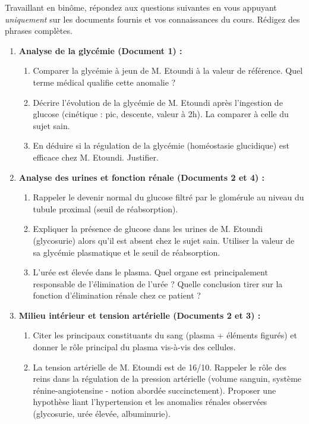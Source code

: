 \documentclass[11pt]{article}
\newcounter{popsec}
\newcounter{popsub}
\newcommand{\courssub}[1]{%
  \stepcounter{popsub}%
  \par\vspace{9pt}\noindent{\popxbold\fontsize{11.5}{13}\selectfont\color{popink}{\color{poporange}\thepopsec.\thepopsub}\hspace{6pt}#1}\par\nopagebreak\vspace{4pt}
}
\begin{document}
\courssub{Consignes}
Travaillant en binôme, répondez aux questions suivantes en vous appuyant \emph{uniquement} sur les documents fournis et vos connaissances du cours. Rédigez des phrases complètes.

\begin{enumerate}
    \item \textbf{Analyse de la glycémie (Document 1) :}
    \begin{enumerate}
        \item Comparer la glycémie à jeun de M. Etoundi à la valeur de référence. Quel terme médical qualifie cette anomalie ?
        \item Décrire l'évolution de la glycémie de M. Etoundi après l'ingestion de glucose (cinétique : pic, descente, valeur à 2h). La comparer à celle du sujet sain.
        \item En déduire si la régulation de la glycémie (homéostasie glucidique) est efficace chez M. Etoundi. Justifier.
    \end{enumerate}
    \item \textbf{Analyse des urines et fonction rénale (Documents 2 et 4) :}
    \begin{enumerate}
        \item Rappeler le devenir normal du glucose filtré par le glomérule au niveau du tubule proximal (seuil de réabsorption).
        \item Expliquer la présence de glucose dans les urines de M. Etoundi (glycosurie) alors qu'il est absent chez le sujet sain. Utiliser la valeur de sa glycémie plasmatique et le seuil de réabsorption.
        \item L'urée est élevée dans le plasma. Quel organe est principalement responsable de l'élimination de l'urée ? Quelle conclusion tirer sur la fonction d'élimination rénale chez ce patient ?
    \end{enumerate}
    \item \textbf{Milieu intérieur et tension artérielle (Documents 2 et 3) :}
    \begin{enumerate}
        \item Citer les principaux constituants du sang (plasma + éléments figurés) et donner le rôle principal du plasma vis-à-vis des cellules.
        \item La tension artérielle de M. Etoundi est de 16/10. Rappeler le rôle des reins dans la régulation de la pression artérielle (volume sanguin, système rénine-angiotensine - notion abordée succinctement). Proposer une hypothèse liant l'hypertension et les anomalies rénales observées (glycosurie, urée élevée, albuminurie).

\end{enumerate}
\end{enumerate}
\end{document}
